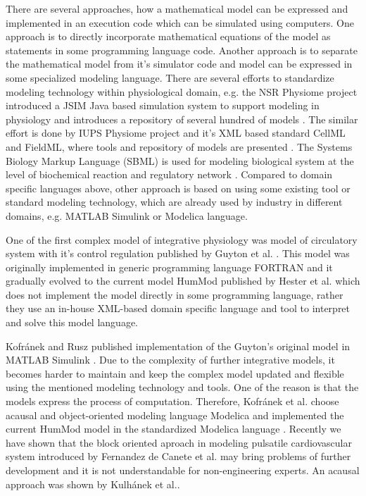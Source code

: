 \documentclass[letterpaper, 10 pt, conference]{ieeeconf}  %
\begin{document}
There are several approaches, how a mathematical model can be expressed and implemented in an execution code which can be simulated using computers. One approach is to directly incorporate mathematical equations of the model as statements in some programming language code. Another approach is to separate the mathematical model from it's simulator code and model can be expressed in some specialized modeling language. 
There are several efforts to standardize modeling technology within physiological domain, e.g. the NSR Physiome project introduced a JSIM Java based simulation system to support modeling in  physiology and introduces a repository of several hundred of models \cite{Butterworth2014,jsim}. The similar effort is done by IUPS Physiome project and it's XML based standard CellML and FieldML, where tools and repository of models are presented \cite{Hunter2004,Yu2011}. The Systems Biology Markup Language (SBML) is used for modeling biological system at the level of biochemical reaction and regulatory network \cite{Hucka2004}.
Compared to domain specific languages above, other approach is based on using some existing tool or standard modeling technology, which are already used by industry in different domains, e.g. MATLAB Simulink or Modelica language. %

One of the first complex model of integrative physiology was model of circulatory system with it's control regulation published by Guyton et al. \cite{Guyton1972}. This model was originally implemented in generic programming language FORTRAN and it gradually evolved to the current model HumMod published by Hester et al. \cite{Hester2011systems,hester2011} which does not implement the model directly in some programming language, rather they use an in-house XML-based domain specific language and tool to interpret and solve this model language.  

Kofránek and Rusz published implementation of the Guyton's original model in MATLAB Simulink \cite{Kofranek2010restoration}. Due to the complexity of further integrative models, it becomes harder to maintain and keep the complex model updated and flexible using the mentioned modeling technology and tools. One of the reason is that the models express the process of computation.  
Therefore, Kofránek et al. choose acausal and object-oriented modeling language Modelica and implemented the current HumMod model in the standardized Modelica language \cite{Kofranek2011hummod}.  Recently we have shown that the block oriented aproach in modeling pulsatile cardiovascular system introduced by Fernandez de Canete et al.\cite{FernandezdeCanete2014} may bring problems of further development and it is not understandable for non-engineering experts. An acausal approach was shown by Kulhánek et al.\cite{Kulhanek2014Modeling}.
\end{document}
